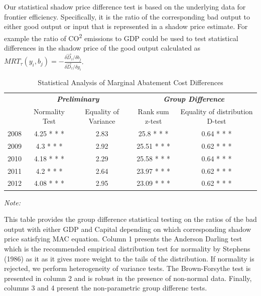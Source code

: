\documentclass[
  10pt,
]{article}
\begin{document}
Our statistical shadow price difference test is based on the underlying
data for frontier efficiency. Specifically, it is the ratio of the
corresponding bad output to either good output or input that is
represented in a shadow price estimate. For example the ratio of
CO\textsuperscript{2} emissions to GDP could be used to test statistical
differences in the shadow price of the good output calculated as
\(MRT_{\tau}(y_{i},b_{j})=-\frac{\delta \vec{D}_{\tau}/\delta b_{j}}{\delta \vec{D}_{\tau}/\delta y_{i}}\).

\begin{table}[H]

\caption{\label{tab:Test1}Statistical Analysis of Marginal Abatement Cost Differences}
\centering
\begin{threeparttable}
\begin{tabular}[t]{lcccc}
\toprule
\multicolumn{1}{c}{\em{\textbf{}}} & \multicolumn{2}{c}{\em{\textbf{Preliminary}}} & \multicolumn{2}{c}{\em{\textbf{Group Difference }}} \\
\cmidrule(l{3pt}r{3pt}){2-3} \cmidrule(l{3pt}r{3pt}){4-5}
  & Normality Test & Equality of Variance & Rank sum z-test & Equality of distribution D-test\\
\midrule
2008 & 4.25 * * * & 2.83 & 25.8 * * * & 0.64 * * *\\
2009 & 4.3 * * * & 2.92 & 25.51 * * * & 0.62 * * *\\
2010 & 4.18 * * * & 2.29 & 25.58 * * * & 0.64 * * *\\
2011 & 4.2 * * * & 2.64 & 23.97 * * * & 0.62 * * *\\
2012 & 4.08 * * * & 2.95 & 23.09 * * * & 0.62 * * *\\
\bottomrule
\end{tabular}
\begin{tablenotes}
\item \textit{Note: } 
\item This table provides the group difference statistical testing on the ratios of the bad output with either GDP and Capital depending on which corresponding shadow price satisfying MAC equation. Column 1 presents the Anderson Darling test which is the recommended empirical distribution test for normality by Stephens (1986) as it as it gives more weight to the tails of the distribution.  If normality is rejected, we perform heterogeneity of variance tests. The Brown-Forsythe test is presented in column 2 and is robust in the presence of non-normal data. Finally, columns 3 and 4 present the non-parametric group differenc tests.
\end{tablenotes}
\end{threeparttable}
\end{table}
\end{document}

